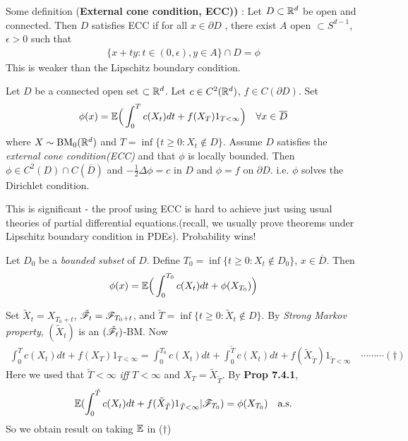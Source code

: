 \documentclass[12pt,a4paper]{report}
\newenvironment{proof}
{\begin{changemargin}{1cm}{0.5cm} 
	}%
	{\end{changemargin}
}
\begin{document}
Some definition (\textbf{External cone condition, ECC))} : Let $D \subset \mathbb{R}^d$ be open and connected. Then $D$ satisfies ECC if for all $x\in \partial D$ , there exist $A$ open $\subset S^{d-1}$, $\epsilon >0$ such that
\begin{align*}
\{x+ty : t\in (0,\epsilon), y\in A \} \cap D = \phi
\end{align*}
This is weaker than the Lipschitz boundary condition.

\s
{} Let $D$ be a connected open set $\subset \mathbb{R}^d$. Let $c\in C^2(\mathbb{R}^d)$, $f\in C(\partial D)$. Set
\begin{align*}
\phi(x) = \mathbb{E} \Big( \int_0^T c(X_t) dt + f(X_T) 1_{T<\infty} \Big) \quad \forall x\in \overline{D}
\end{align*}
where $X \sim \text{BM}_0(\mathbb{R}^d)$ and $T = \inf \{ t\geq 0: X_t \not\in D \}$. Assume $D$ satisfies the \emph{external cone condition(ECC)} and that $\phi$ is locally bounded. Then $\phi \in C^2(D) \cap C(\overline{D})$ and $-\frac{1}{2}\Delta \phi =c$ in $D$ and $\phi =f$ on $\partial D$. i.e. $\phi$ solves the Dirichlet condition.
\s

This is significant - the proof using ECC is hard to achieve just using usual theories of partial differential equations.(recall, we usually prove theorems under Lipschitz boundary condition in PDEs). Probability wins!
\s

 Let $D_0$ be a \emph{bounded subset} of $D$. Define $T_0 = \inf \{t\geq 0: X_t \not\in D_0 \}$, $x\in \overline{D}$. Then
\begin{align*}
\phi(x) = \mathbb{E} \Big( \int_0^{T_0} c(X_t) dt + \phi(X_{T_{0}}) \Big)
\end{align*}
\begin{proof}
\pf Set $\tilde{X}_t = X_{T_0 +t}$, $\tilde{\mathscr{F}}_{t} = \mathscr{F}_{T_0 +t}$, and $\tilde{T} = \inf \{ t\geq 0 : \tilde{X}_t \not\in D \}$. By \emph{Strong Markov property}, $(\tilde{X}_t)$ is an $(\tilde{\mathscr{F}}_t)$-BM. Now
\begin{align*}
\int_0^T c(X_t) dt + f(X_T) 1_{T<\infty} = \int_0^{T_0} c(X_t) dt + \int_0^{\tilde{T}} c(X_t) dt + f(\tilde{X}_{\tilde{T}})1_{\tilde{T}<\infty} \quad \cdots\cdots\cdots (\dagger)
\end{align*}
Here we used that $\tilde{T}<\infty$ \emph{iff} $T<\infty$ and $X_T = \tilde{X}_{\tilde{T}}$. By \textbf{Prop 7.4.1},
\begin{align*}
\mathbb{E}( \int_0^{\tilde{T}} c(X_t) dt + f(\tilde{X}_{\tilde{T}})1_{\tilde{T}<\infty} | \mathscr{F}_{T_0} ) = \phi(X_{T_0}) \quad \text{a.s.}
\end{align*}
So we obtain result on taking $\mathbb{E}$ in ($\dagger$)

\eop
\end{proof}
\s
\end{document}
